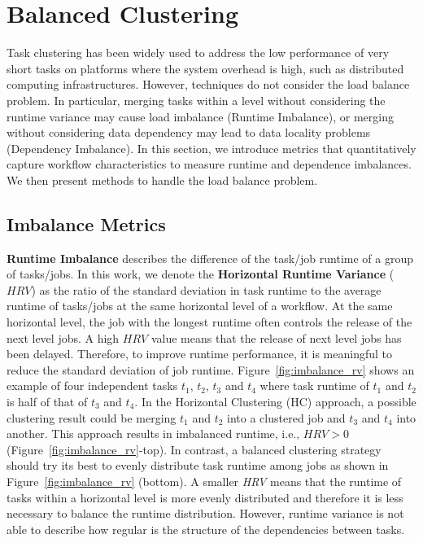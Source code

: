 \section{Balanced Clustering}
\label{sec:imbalance}

Task clustering has been widely used to address the low performance of very short tasks on platforms where the system overhead is high, such as distributed computing infrastructures. However, techniques do not consider the load balance problem. In particular, merging tasks within a level without considering the runtime variance may cause load imbalance (Runtime Imbalance), or merging without considering data dependency may lead to data locality problems (Dependency Imbalance).
In this section, we introduce metrics that quantitatively capture workflow characteristics to measure runtime and dependence imbalances. We then present methods to handle the load balance problem.


\subsection{Imbalance Metrics}

\textbf{Runtime Imbalance} describes the difference of the task/job runtime of a group of tasks/jobs. In this work, we denote the \textbf{Horizontal Runtime Variance} ($HRV$) as the ratio of the standard deviation in task runtime to the average runtime of tasks/jobs at the same horizontal level of a workflow. At the same horizontal level, the job with the longest runtime often controls the release of the next level jobs. A high $HRV$ value means that the release of next level jobs has been delayed.
Therefore, to improve runtime performance, it is meaningful to reduce the standard deviation of job runtime. Figure~\ref{fig:imbalance_rv} shows an example of four independent tasks $t_1$, $t_2$, $t_3$ and $t_4$ where task runtime of $t_1$ and $t_2$ is half of that of $t_3$ and $t_4$. In the Horizontal Clustering (HC) approach, a possible clustering result could be merging $t_1$ and $t_2$ into a clustered job and $t_3$ and $t_4$ into another. This approach results in imbalanced runtime, i.e., $HRV > 0$ (Figure~\ref{fig:imbalance_rv}-top). In contrast, a balanced clustering strategy should try its best to evenly distribute task runtime among jobs as shown in Figure~\ref{fig:imbalance_rv} (bottom). A smaller \emph{HRV} means that the runtime of tasks within a horizontal level is more evenly distributed and therefore it is less necessary to balance the runtime distribution. However, runtime variance is not able to describe how regular is the structure of the dependencies between tasks.

